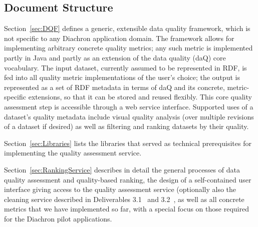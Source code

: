 
\subsection{Document Structure}
\label{sec:DocumentStructure} 

Section~\ref{sec:DQF} defines a generic, extensible data quality framework, which is not specific to any Diachron application domain.  The framework allows for implementing arbitrary concrete quality metrics; any such metric is implemented partly in Java and partly as an extension of the data quality (daQ) core vocabulary.  The input dataset, currently assumed to be represented in RDF, is fed into all quality metric implementations of the user's choice; the output is represented as a set of RDF metadata in terms of daQ and its concrete, metric-specific extensions, so that it can be stored and reused flexibly.  This core quality assessment step is accessible through a web service interface.  Supported uses of a dataset's quality metadata include visual quality analysis (over multiple revisions of a dataset if desired) as well as filtering and ranking datasets by their quality.  

Section~\ref{sec:Libraries} lists the libraries that served as technical prerequisites for implementing the quality assessment service.

Section~\ref{sec:RankingService} describes in detail the general processes of data quality assessment and quality-based ranking, the design of a self-contained user interface giving access to the quality assessment service (optionally also the cleaning service described in Deliverables 3.1~\cite{d3.1} and 3.2~\cite{diachron-d3.2}, as well as all concrete metrics that we have implemented so far, with a special focus on those required for the Diachron pilot applications.


